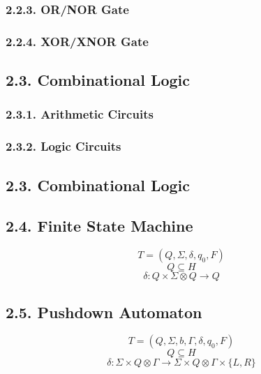 \documentclass[
]{article}
\begin{document}
\hypertarget{ornor-gate}{%
\subsubsection{2.2.3. OR/NOR Gate}\label{ornor-gate}}

\hypertarget{xorxnor-gate}{%
\subsubsection{2.2.4. XOR/XNOR Gate}\label{xorxnor-gate}}

\hypertarget{combinational-logic}{%
\subsection{2.3. Combinational Logic}\label{combinational-logic}}

\hypertarget{arithmetic-circuits}{%
\subsubsection{2.3.1. Arithmetic Circuits}\label{arithmetic-circuits}}

\hypertarget{logic-circuits}{%
\subsubsection{2.3.2. Logic Circuits}\label{logic-circuits}}

\hypertarget{combinational-logic-1}{%
\subsection{2.3. Combinational Logic}\label{combinational-logic-1}}

\hypertarget{finite-state-machine}{%
\subsection{2.4. Finite State Machine}\label{finite-state-machine}}

\[{\displaystyle T = (Q, \Sigma, \delta, q_{0}, F)}\]
\[{\displaystyle Q \subseteq H}\]
\[{\displaystyle \delta : Q \times \Sigma \otimes Q \rightarrow Q}\]

\hypertarget{pushdown-automaton}{%
\subsection{2.5. Pushdown Automaton}\label{pushdown-automaton}}

\[{\displaystyle T = (Q, \Sigma, b, \Gamma, \delta, q_{0}, F)}\]
\[{\displaystyle Q \subseteq H}\]
\[{\displaystyle \delta : \Sigma \times Q \otimes \Gamma \to \Sigma \times Q \otimes \Gamma \times \{L, R\}}\]
\end{document}
